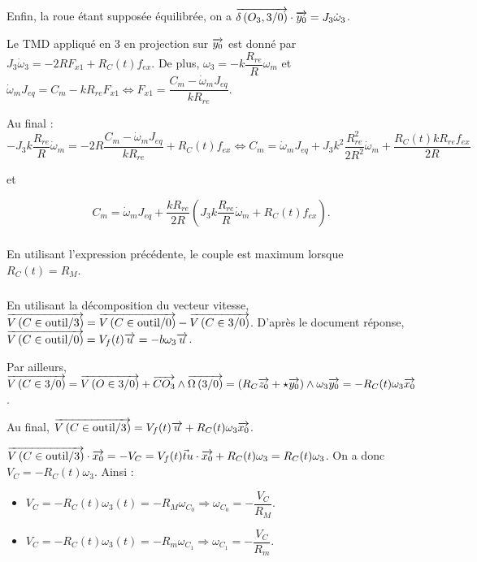 \documentclass[10pt,fleqn]{article} %
\begin{document}
Enfin, la roue étant supposée équilibrée, on a $\overrightarrow{\delta \left( {O_3}, {3} /{0}\right)}\cdot\overrightarrow{y_0}=J_3\dot{\omega}_3$.


Le TMD appliqué en 3 en projection sur $\overrightarrow{y_0}$  est donné par 
$J_3\dot{\omega}_3=-2RF_{x1}+R_C(t) f_{ex}$. De plus, 
$\omega_3= -k\dfrac{R_{re}}{R}\omega_m$ et 
$\dot{\omega}_m J_{eq}= C_m-kR_{re}F_{x1} \Leftrightarrow F_{x1}= \dfrac{C_m-\dot{\omega}_m J_{eq}}{kR_{re}}$.

Au final :
$$-J_3k\dfrac{R_{re}}{R}\dot{\omega}_m=-2R\dfrac{C_m-\dot{\omega}_m J_{eq}}{kR_{re}}+R_C(t) f_{ex} \Leftrightarrow
C_m=\dot{\omega}_m J_{eq}
+J_3k^2\dfrac{R_{re}^2}{2R^2}\dot{\omega}_m+ \dfrac{R_C(t) kR_{re} f_{ex}}{2R}$$

et

$$C_m=\dot{\omega}_m J_{eq}
+\dfrac{kR_{re} }{2R}\left(J_3k\dfrac{R_{re}}{R}\dot{\omega}_m+ R_C(t)  f_{ex}\right).$$


%
%
%
% 

\subparagraph{}
En utilisant l'expression précédente, le couple est maximum lorsque $R_C(t)=R_M$.

\subparagraph{}
En utilisant la décomposition du vecteur vitesse, 
$\overrightarrow{V\left( {C} \in {\text{outil}}/{3}\right)}=\overrightarrow{V\left( {C} \in {\text{outil}}/{0}\right)}-\overrightarrow{V\left( {C} \in {\text{3}}/{0}\right)}$. 
D'après le document réponse, $\overrightarrow{V\left( {C} \in {\text{outil}}/{0}\right)}=V_f(t)\overrightarrow{u}=-b\omega_3\overrightarrow{u}$. 

Par ailleurs, $\overrightarrow{V\left( {C} \in {\text{3}}/{0}\right)}=\overrightarrow{V\left( {O} \in {\text{3}}/{0}\right)}+\overrightarrow{CO_3}\wedge \overrightarrow{\Omega\left( {3}/{0}\right)}=\left( R_C \overrightarrow{z_0}+ \star \overrightarrow{y_0}\right)\wedge \omega_3\overrightarrow{y_0}=-R_C(t)\omega_3\overrightarrow{x_0}$.

Au final, $\overrightarrow{V\left( {C} \in {\text{outil}}/{3}\right)}=V_f(t)\overrightarrow{u}+R_C(t)\omega_3\overrightarrow{x_0}$.

$\overrightarrow{V\left( {C} \in {\text{outil}}/{3}\right)} \cdot \overrightarrow{x_0} = -V_C =  V_f(t)\vec t{u}\cdot \overrightarrow{x_0}+R_C(t)\omega_3 = R_C(t)\omega_3$. On a donc $V_C=-R_C(t)\omega_3$. Ainsi : 
\begin{itemize}
\item $V_C=-R_C(t)\omega_3(t)=-R_M \omega_{C_0}\Rightarrow \omega_{C_0}=-\dfrac{V_C}{R_M}$.
\item $V_C=-R_C(t)\omega_3(t)=-R_m \omega_{C_1}\Rightarrow \omega_{C_1}=-\dfrac{V_C}{R_m}$.
\end{itemize}
 
\end{document}
